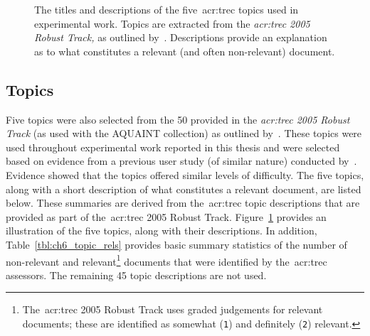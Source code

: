 \begin{figure}[t!]
    \centering
    \caption[TREC topic titles and descriptions]{The titles and descriptions of the five~\gls{acr:trec} topics used in experimental work. Topics are extracted from the \emph{\gls{acr:trec} 2005 Robust Track,} as outlined by~\cite{voorhees2006trec_robust}. Descriptions provide an explanation as to what constitutes a relevant (and often non-relevant) document.}
    \label{fig:topics}
\end{figure}

\subsection{Topics}\label{sec:methodology:collection:topics}
Five topics were also selected from the 50 provided in the \emph{\gls{acr:trec} 2005 Robust Track} (as used with the AQUAINT collection) as outlined by~\cite{voorhees2006trec_robust}. These topics were used throughout experimental work reported in this thesis and were selected based on evidence from a previous user study (of similar nature) conducted by~\cite{kelly2009user_study}. Evidence showed that the topics offered similar levels of difficulty. The five topics, along with a short description of what constitutes a relevant document, are listed below. These summaries are derived from the~\gls{acr:trec} topic descriptions that are provided as part of the~\gls{acr:trec} 2005 Robust Track. Figure~\ref{fig:topics} provides an illustration of the five topics, along with their descriptions. In addition, Table~\ref{tbl:ch6_topic_rels} provides basic summary statistics of the number of non-relevant and relevant\footnote{The~\gls{acr:trec} 2005 Robust Track uses graded judgements for relevant documents; these are identified as somewhat (\texttt{1}) and definitely (\texttt{2}) relevant.} documents that were identified by the~\gls{acr:trec} assessors. The remaining 45 topic descriptions are not used.

